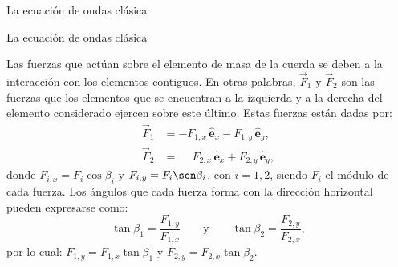 \documentclass[11pt,handout,aspectratio=1610]{beamer}
\newcommand{\ver}[1]{\hat{\mathbf{#1}}}
\begin{document}
\begin{frame}{La ecuación de ondas clásica}
\begin{figure}
    \end{figure}

\end{frame}

\begin{frame}{La ecuación de ondas clásica}

    Las fuerzas que actúan sobre el elemento de masa de la cuerda se deben a la interacción con los elementos contiguos. En otras palabras, $\vec{F}_1$ y $\vec{F}_2$ son las fuerzas que los elementos que se encuentran a la izquierda y a la derecha del elemento considerado ejercen sobre este último. Estas fuerzas están dadas por: 
    \begin{align*}
        \vec{F}_1 &= - F_{1,x} \, \ver{e}_x - F_{1,y} \, \ver{e}_y, \\
        \vec{F}_2 &= \phantom{-}F_{2,x} \, \ver{e}_x + F_{2,y}\, \ver{e}_y,
    \end{align*} donde $F_{i,x} = F_i \cos \beta_i$ y $F_{i,y} = F_i \sen \beta_i$, con $i=1,2$, siendo $F_i$ el módulo de cada fuerza. Los ángulos que cada fuerza forma con la dirección horizontal pueden expresarse como: $$ \tan \beta_1 = \frac{F_{1,y}}{F_{1,x}} \qquad \text{y} \qquad \tan \beta_2 = \frac{F_{2,y}}{F_{2,x}}, $$ por lo cual: $F_{1,y} = F_{1,x} \tan \beta_1$ y $F_{2,y} = F_{2,x} \tan \beta_2$.

\end{frame}
\end{document}
